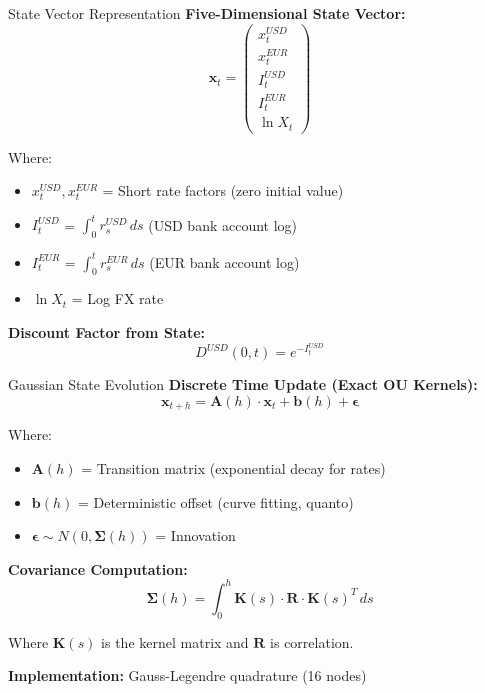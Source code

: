 \documentclass[aspectratio=169,11pt]{beamer}
\begin{document}
\begin{frame}{State Vector Representation}
\textbf{Five-Dimensional State Vector:}
\[
\mathbf{x}_t = \begin{pmatrix}
x_t^{USD} \\
x_t^{EUR} \\
I_t^{USD} \\
I_t^{EUR} \\
\ln X_t
\end{pmatrix}
\]

Where:
\begin{itemize}
    \item $x_t^{USD}, x_t^{EUR}$ = Short rate factors (zero initial value)
    \item $I_t^{USD}$ = $\int_0^t r_s^{USD}\, ds$ (USD bank account log)
    \item $I_t^{EUR}$ = $\int_0^t r_s^{EUR}\, ds$ (EUR bank account log)
    \item $\ln X_t$ = Log FX rate
\end{itemize}

\textbf{Discount Factor from State:}
\[
D^{USD}(0,t) = e^{-I_t^{USD}}
\]
\end{frame}

\begin{frame}{Gaussian State Evolution}
\textbf{Discrete Time Update (Exact OU Kernels):}
\[
\mathbf{x}_{t+h} = \mathbf{A}(h) \cdot \mathbf{x}_t + \mathbf{b}(h) + \boldsymbol{\epsilon}
\]

Where:
\begin{itemize}
    \item $\mathbf{A}(h)$ = Transition matrix (exponential decay for rates)
    \item $\mathbf{b}(h)$ = Deterministic offset (curve fitting, quanto)
    \item $\boldsymbol{\epsilon} \sim N(0, \boldsymbol{\Sigma}(h))$ = Innovation
\end{itemize}

\textbf{Covariance Computation:}
\[
\boldsymbol{\Sigma}(h) = \int_0^h \mathbf{K}(s) \cdot \mathbf{R} \cdot \mathbf{K}(s)^T\, ds
\]

Where $\mathbf{K}(s)$ is the kernel matrix and $\mathbf{R}$ is correlation.

\textbf{Implementation:} Gauss-Legendre quadrature (16 nodes)
\end{frame}
\end{document}
